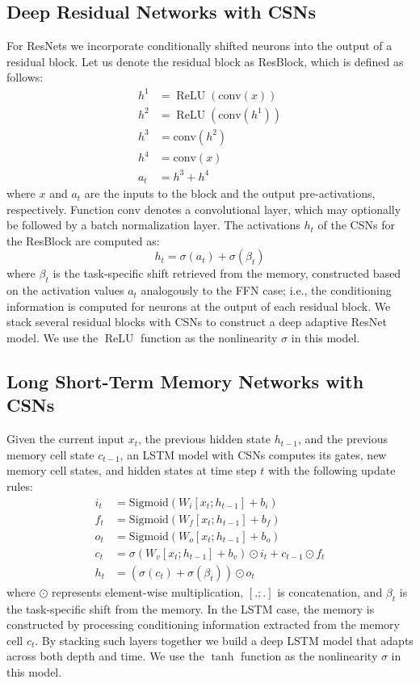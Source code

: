 \documentclass{article}
\DeclareMathOperator*{\relu}{ReLU}
\begin{document}
\subsection{Deep Residual Networks with CSNs}
\label{ada_resnet}
For ResNets \cite{he2016deep} we incorporate conditionally shifted neurons into the output of a residual block. Let us denote the residual block as ResBlock, which is defined as follows:
\begin{align*}
h^1 &= \relu(\text{conv}(x))\\
h^2 &= \relu(\text{conv}(h^1))\\
h^3 &= \text{conv}(h^2)\\
h^4 &= \text{conv}(x)\\
a_t &= h^3 + h^4
\end{align*}
where $x$ and $a_t$ are the inputs to the block and the output pre-activations, respectively. Function $\text{conv}$ denotes a convolutional layer, which may optionally be followed by 
a batch normalization \cite{ioffe2015batchnorm} layer. The activations $h_t$ of the CSNs for the ResBlock are computed as:
\begin{equation*}
h_t = \sigma(a_t) + \sigma(\beta_{t})
\end{equation*}
where $\beta_{t}$ is the task-specific shift retrieved from the memory, constructed based on the activation values $a_t$ analogously to the FFN case; i.e., the conditioning information is computed for neurons at the output of each residual block. We stack several residual blocks with CSNs to construct a deep adaptive ResNet model. 
We use the $\relu$ function as the nonlinearity $\sigma$ in this model.


\subsection{ Long Short-Term Memory Networks with CSNs}
\label{ada_lstm}
Given the current input $x_t$, the previous hidden state $h_{t-1}$, and the previous memory cell state $c_{t-1}$, an LSTM model with CSNs computes its gates, new memory cell states, and hidden states at time step $t$ with the following update rules:
\begin{align*}
i_t &= \text{Sigmoid}(W_{i} [x_t;h_{t-1}] + b_{i})\\
f_t &= \text{Sigmoid}(W_{f}[x_t;h_{t-1}] + b_{f})\\
o_t &= \text{Sigmoid}(W_{o} [x_t;h_{t-1}] + b_{o})\\
c_t &= \sigma (W_{v} [x_t;h_{t-1}] + b_{v}) \odot i_t + c_{t-1} \odot f_t\\
h_t &= (\sigma(c_t) + \sigma(\beta_{t})) \odot o_t
\end{align*}
where $\odot$ represents element-wise multiplication, $[.;.]$ is concatenation, and $\beta_{t}$ is the task-specific shift from the memory. In the LSTM case, the memory is constructed by processing conditioning information extracted from the memory cell $c_t$. By stacking such layers together we build a deep LSTM model that adapts across both depth and time. 
We use the $\tanh$ function as the nonlinearity $\sigma$ in this model.
\end{document}
